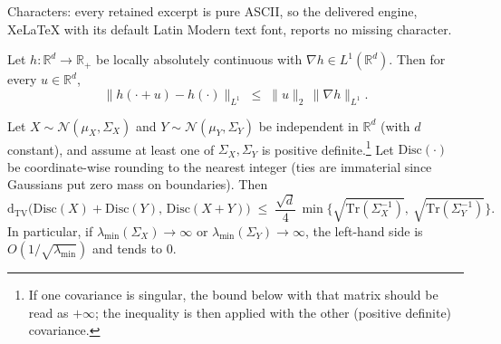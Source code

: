 \documentclass[10pt,a4paper]{amsart}
\newcommand{\disc}{\mathrm{Disc}}
\newcommand{\dtv}{\mathrm{d_{TV}}}
\begin{document}
Characters: every retained excerpt is pure ASCII, so the delivered engine, XeLaTeX with its default Latin Modern text font, reports no missing character.
\begin{lemma}
\label{lem:shift-L1}
Let $h:\mathbb{R}^d\to\mathbb{R}_+$ be locally absolutely continuous with $\nabla h\in L^1(\mathbb{R}^d)$.
Then for every $u\in\mathbb{R}^d$,
\[
\|h(\cdot+u)-h(\cdot)\|_{L^1}\;\le\;\|u\|_2\,\|\nabla h\|_{L^1}.
\]
\end{lemma}

\begin{lemma}
\label{lem:disc-conv-commute-gauss}
Let $X\sim\mathcal{N}(\mu_X,\Sigma_X)$ and $Y\sim\mathcal{N}(\mu_Y,\Sigma_Y)$ be independent in $\mathbb{R}^d$ (with $d$ constant), and assume at least one of $\Sigma_X,\Sigma_Y$ is positive definite.\footnote{If one covariance is singular, the bound below with that matrix should be read as $+\infty$; the inequality is then applied with the other (positive definite) covariance.} Let $\disc(\cdot)$ be coordinate-wise rounding to the nearest integer (ties are immaterial since Gaussians put zero mass on boundaries). Then
\[
\dtv\!\big(\disc(X)+\disc(Y),\,\disc(X+Y)\big)
\;\le\; \frac{\sqrt{d}}{4}\,
\min\!\Big\{\sqrt{\mathrm{Tr}(\Sigma_X^{-1})},\ \sqrt{\mathrm{Tr}(\Sigma_Y^{-1})}\Big\}.
\]
In particular, if $\lambda_{\min}(\Sigma_X)\to\infty$ or $\lambda_{\min}(\Sigma_Y)\to\infty$, the left-hand side is $O(1/\sqrt{\lambda_{\min}})$ and tends to $0$.
\end{lemma}
\end{document}
